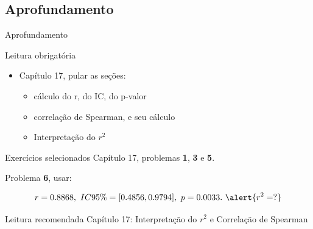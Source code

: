 \documentclass{beamer}
\begin{document}
\subsection{Aprofundamento}

\begin{frame}{Aprofundamento}
  \begin{block}{Leitura obrigatória}
    \begin{itemize}
      \small
    \item Capítulo 17, pular as seções:
      \begin{itemize}
        \footnotesize
      \item cálculo do r, do IC, do p-valor
      \item correlação de Spearman, e seu cálculo
      \item Interpretação do $r^2$
      \end{itemize}
    \end{itemize}
  \end{block}
  \begin{block}{Exercícios selecionados}
    \scriptsize
    Capítulo 17, problemas {\bf 1}, {\bf 3} e {\bf 5}.

    \medskip
    Problema {\bf 6}, usar:

    $$r=0.8868,\ IC95\%=[0.4856, 0.9794],\ p = 0.0033.\ \alert{r^2=?}$$ 
  \end{block}
  \begin{block}{Leitura recomendada}
    \small
    Capítulo 17: Interpretação do $r^2$ e Correlação de Spearman
  \end{block}
\end{frame}
\end{document}
